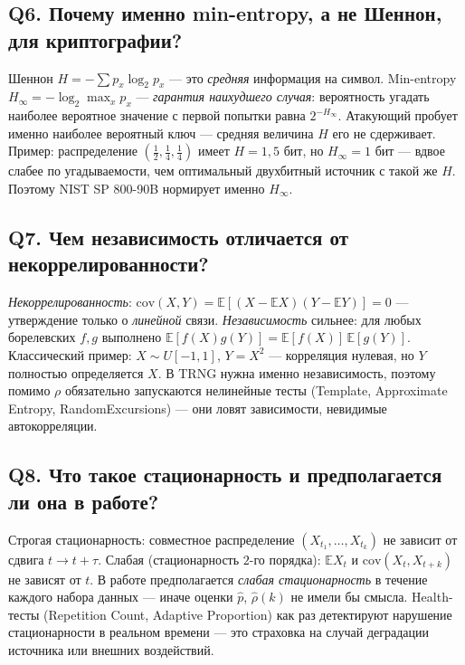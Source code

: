 \documentclass[12pt,a4paper]{extarticle}
\begin{document}
\subsection*{Q6. Почему именно min-entropy, а не Шеннон, для криптографии?}
Шеннон $H = -\sum p_x\log_2 p_x$ --- это \emph{средняя} информация на символ.
Min-entropy $H_\infty = -\log_2 \max_x p_x$ --- \emph{гарантия наихудшего случая}:
вероятность угадать наиболее вероятное значение с первой попытки равна $2^{-H_\infty}$.
Атакующий пробует именно наиболее вероятный ключ --- средняя величина $H$ его не сдерживает.
Пример: распределение $(\tfrac12, \tfrac14, \tfrac14)$ имеет $H = 1{,}5$ бит, но
$H_\infty = 1$ бит --- вдвое слабее по угадываемости, чем оптимальный двухбитный источник
с такой же $H$. Поэтому NIST SP 800-90B нормирует именно $H_\infty$.

\subsection*{Q7. Чем независимость отличается от некоррелированности?}
\emph{Некоррелированность}: $\mathrm{cov}(X,Y) = \mathbb{E}[(X-\mathbb{E}X)(Y-\mathbb{E}Y)] = 0$
--- утверждение только о \emph{линейной} связи. \emph{Независимость} сильнее: для любых
борелевских $f,g$ выполнено $\mathbb{E}[f(X)g(Y)] = \mathbb{E}[f(X)]\,\mathbb{E}[g(Y)]$.
Классический пример: $X\sim U[-1,1]$, $Y=X^2$ --- корреляция нулевая, но $Y$ полностью
определяется $X$. В TRNG нужна именно независимость, поэтому помимо $\rho$ обязательно
запускаются нелинейные тесты (Template, Approximate Entropy, RandomExcursions) ---
они ловят зависимости, невидимые автокорреляции.

\subsection*{Q8. Что такое стационарность и предполагается ли она в работе?}
Строгая стационарность: совместное распределение $(X_{t_1},\ldots,X_{t_k})$ не зависит
от сдвига $t \to t+\tau$. Слабая (стационарность $2$-го порядка): $\mathbb{E}X_t$ и
$\mathrm{cov}(X_t, X_{t+k})$ не зависят от $t$. В работе предполагается \emph{слабая
стационарность} в течение каждого набора данных --- иначе оценки $\hat p$, $\hat\rho(k)$
не имели бы смысла. Health-тесты (Repetition Count, Adaptive Proportion) как раз
детектируют нарушение стационарности в реальном времени --- это страховка на случай
деградации источника или внешних воздействий.
\end{document}
